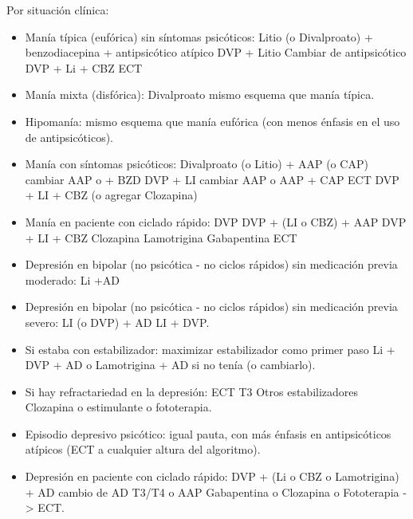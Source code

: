 Por situación clínica:
\begin{itemize}
	\item Manía típica (eufórica) sin síntomas psicóticos: Litio (o Divalproato) \faArrowCircleRight + benzodiacepina \faArrowCircleRight + antipsicótico atípico \faArrowCircleRight DVP + Litio \faArrowCircleRight Cambiar de antipsicótico \faArrowCircleRight DVP + Li + CBZ \faArrowCircleRight ECT
	\item Manía mixta (disfórica): Divalproato \faArrowCircleRight mismo esquema que manía típica.
	\item Hipomanía: mismo esquema que manía eufórica (con menos énfasis en el uso de antipsicóticos).
	\item Manía con síntomas psicóticos: Divalproato (o Litio) + AAP (o CAP) \faArrowCircleRight cambiar AAP o + BZD \faArrowCircleRight DVP + LI \faArrowCircleRight cambiar AAP o AAP + CAP \faArrowCircleRight ECT \faArrowCircleRight DVP + LI + CBZ (o agregar Clozapina)
	\item Manía en paciente con ciclado rápido: DVP \faArrowCircleRight DVP + (LI o CBZ) \faArrowCircleRight + AAP \faArrowCircleRight DVP + LI + CBZ \faArrowCircleRight Clozapina \faArrowCircleRight Lamotrigina \faArrowCircleRight Gabapentina \faArrowCircleRight ECT
	\item Depresión en bipolar (no psicótica - no ciclos rápidos) sin medicación previa moderado: Li \faArrowCircleRight +AD
	\item Depresión en bipolar (no psicótica - no ciclos rápidos) sin medicación previa severo: LI (o DVP) + AD \faArrowCircleRight LI + DVP.
	\item Si estaba con estabilizador: maximizar estabilizador como primer paso \faArrowCircleRight Li + DVP \faArrowCircleRight + AD o Lamotrigina \faArrowCircleRight + AD si no tenía (o cambiarlo).
	\item Si hay refractariedad en la depresión: ECT \faArrowCircleRight T3 \faArrowCircleRight Otros estabilizadores \faArrowCircleRight Clozapina o estimulante o fototerapia.
	\item Episodio depresivo psicótico: igual pauta, con más énfasis en antipsicóticos atípicos (ECT a cualquier altura del algoritmo).
	\item Depresión en paciente con ciclado rápido: DVP \faArrowCircleRight + (Li o CBZ o Lamotrigina) \faArrowCircleRight + AD \faArrowCircleRight cambio de AD \faArrowCircleRight T3/T4 o AAP \faArrowCircleRight Gabapentina o Clozapina o Fototerapia -> ECT.
\end{itemize}

